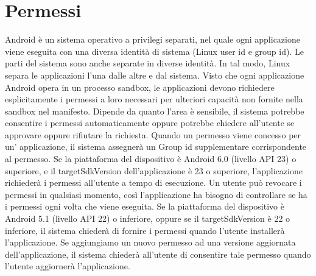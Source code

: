 \documentclass[12pt]{report}
\begin{document}
\section{Permessi}
Android è un sistema operativo a privilegi separati, nel quale ogni applicazione viene eseguita con una diversa identità di sistema (Linux user id e group id). Le parti del sistema sono anche separate in diverse identità. In tal modo, Linux separa le applicazioni l'una dalle altre e dal sistema. Visto che ogni applicazione Android opera in un processo sandbox, le applicazioni devono richiedere esplicitamente i permessi a loro necessari per ulteriori capacità non fornite nella sandbox nel manifesto. Dipende da quanto l'area è sensibile, il sistema potrebbe consentire i permessi automaticamente oppure potrebbe chiedere all'utente se approvare oppure rifiutare la richiesta. Quando un permesso viene concesso per un' applicazione, il sistema assegnerà un Group id supplementare corrispondente al permesso. Se la piattaforma del dispositivo è Android 6.0 (livello API 23) o superiore, e il targetSdkVersion dell'applicazione è 23 o superiore, l'applicazione richiederà i permessi all'utente a tempo di esecuzione. Un utente può revocare i permessi in qualsiasi momento, così l'applicazione ha bisogno di controllare se ha i permessi ogni volta che viene eseguita. Se la piattaforma del dispositivo è Android 5.1 (livello API 22) o inferiore, oppure se il targetSdkVersion è 22 o inferiore, il sistema chiederà di fornire i permessi quando l'utente installerà l'applicazione. Se aggiungiamo un nuovo permesso ad una versione aggiornata dell'applicazione, il sistema chiederà all'utente di consentire tale permesso quando l'utente aggiornerà l'applicazione.
\end{document}
